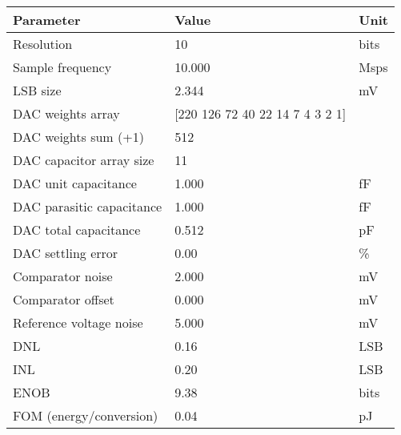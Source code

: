 \begin{tabular}{lll}
\toprule
Parameter & Value & Unit \\
\midrule
Resolution & 10 & bits \\
Sample frequency & 10.000 & Msps \\
LSB size & 2.344 & mV \\
DAC weights array & [220 126  72  40  22  14   7   4   3   2   1] &  \\
DAC weights sum (+1) & 512 &  \\
DAC capacitor array size & 11 &  \\
DAC unit capacitance & 1.000 & fF \\
DAC parasitic capacitance & 1.000 & fF \\
DAC total capacitance & 0.512 & pF \\
DAC settling error & 0.00 & \% \\
Comparator noise & 2.000 & mV \\
Comparator offset & 0.000 & mV \\
Reference voltage noise & 5.000 & mV \\
DNL & 0.16 & LSB \\
INL & 0.20 & LSB \\
ENOB & 9.38 & bits \\
FOM (energy/conversion) & 0.04 & pJ \\
\bottomrule
\end{tabular}
